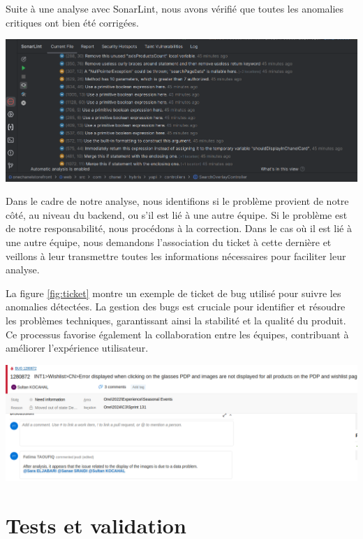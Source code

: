 Suite à une analyse avec SonarLint, nous avons vérifié que toutes les anomalies critiques ont bien été corrigées.

\begin{center}
    \centering
    \includegraphics[width=19cm]{Figures/bug1.png}
\end{center}


Dans le cadre de notre analyse, nous identifions si le problème provient de notre côté, au niveau du backend, ou s'il est lié à une autre équipe. Si le problème est de notre responsabilité, nous procédons à la correction. Dans le cas où il est lié à une autre équipe, nous demandons l'association du ticket à cette dernière et veillons à leur transmettre toutes les informations nécessaires pour faciliter leur analyse.

 La figure  \ref{fig:ticket}  montre un exemple de ticket de bug utilisé pour suivre les anomalies détectées. La gestion des bugs est cruciale pour identifier et résoudre les problèmes techniques, garantissant ainsi la stabilité et la qualité du produit. Ce processus favorise également la collaboration entre les équipes, contribuant à améliorer l'expérience utilisateur.
\begin{center}
    \centering
    \includegraphics[width=19cm]{Figures/Screens/ticket.png}
    \label{fig:ticket}
\end{center}
\section{Tests et validation}
